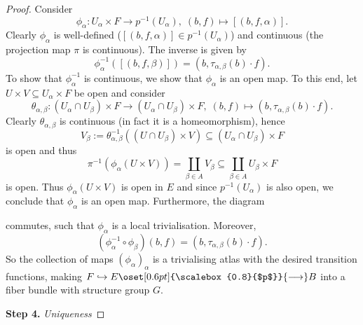 \begin{proof}
        Consider
        \[
        \phi_\alpha \colon U_\alpha \times F \to p^{-1}(U_\alpha), \; (b,f) \mapsto [(b,f,\alpha)].
        \]
        Clearly $\phi_\alpha$ is well-defined ($[(b,f,\alpha)] \in p^{-1}(U_\alpha)$) and continuous (the projection map $\pi$ is continuous). The inverse is given by
        \[
        \phi_\alpha^{-1}([(b,f,\beta)]) = (b,\tau_{\alpha,\beta}(b) \cdot f).
        \]
        To show that $\phi_\alpha^{-1}$ is continuous, we show that $\phi_\alpha$ is an open map. To this end, let $U \times V \subseteq U_\alpha \times F$ be open and consider
        \[
        \theta_{\alpha,\beta} \colon (U_\alpha \cap U_\beta) \times F \to (U_\alpha \cap U_\beta) \times F, \; (b,f) \mapsto (b, \tau_{\alpha,\beta}(b) \cdot f). 
        \]
        Clearly $\theta_{\alpha,\beta}$ is continuous (in fact it is a homeomorphism), hence
        \[
        V_\beta := \theta_{\alpha,\beta}^{-1}((U \cap U_\beta) \times V) \subseteq (U_\alpha \cap U_\beta) \times F
        \]
        is open and thus
        \[
        \pi^{-1}(\phi_\alpha(U \times V)) = \coprod_{\beta \in A} V_\beta \subseteq \coprod_{\beta \in A} U_\beta \times F
        \]
        is open. Thus $\phi_\alpha(U\times V)$ is open in $E$ and since $p^{-1}(U_\alpha)$ is also open, we conclude that $\phi_\alpha$ is an open map. Furthermore, the diagram
        \begin{center}
        \end{center}
        commutes, such that $\phi_\alpha$ is a local trivialisation. Moreover,
        \[
        (\phi_\alpha^{-1} \circ \phi_\beta)(b,f) = (b,\tau_{\alpha,\beta}(b) \cdot f).
        \]
        So the collection of maps $(\phi_\alpha)_\alpha$ is a trivialising atlas with the desired transition functions, making $F \hookrightarrow E \oset[0.6pt]{\scalebox{0.8}{$p$}}{\longrightarrow} B$ into a fiber bundle with structure group $G$.

        \textbf{Step 4.} \textit{Uniqueness}


\end{proof}

